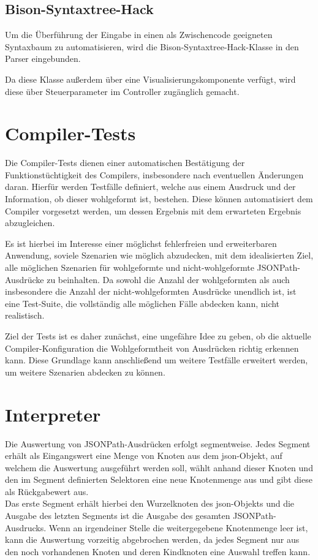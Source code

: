 \documentclass[oneside]{ausarbeitung}
\begin{document}
\subsection{Bison-Syntaxtree-Hack}

Um die Überführung der Eingabe in einen als Zwischencode geeigneten Syntaxbaum zu automatisieren, wird die Bison-Syntaxtree-Hack-Klasse \cite{Bantel:bisonhack} in den Parser eingebunden. 

Da diese Klasse außerdem über eine Visualisierungskomponente verfügt, wird diese über Steuerparameter im Controller zugänglich gemacht.



\section{Compiler-Tests}

Die Compiler-Tests dienen einer automatischen Bestätigung der Funktionstüchtigkeit des Compilers, insbesondere nach eventuellen Änderungen daran. Hierfür werden Testfälle definiert, welche aus einem Ausdruck und der Information, ob dieser wohlgeformt ist, bestehen. Diese können automatisiert dem Compiler vorgesetzt werden, um dessen Ergebnis mit dem erwarteten Ergebnis abzugleichen.

Es ist hierbei im Interesse einer möglichst fehlerfreien und erweiterbaren Anwendung, soviele Szenarien wie möglich abzudecken, mit dem idealisierten Ziel, alle möglichen Szenarien für wohlgeformte und nicht-wohlgeformte JSONPath-Ausdrücke zu beinhalten. Da sowohl die Anzahl der wohlgeformten als auch insbesondere die Anzahl der nicht-wohlgeformten Ausdrücke unendlich ist, ist eine Test-Suite, die vollständig alle möglichen Fälle abdecken kann, nicht realistisch.

Ziel der Tests ist es daher zunächst, eine ungefähre Idee zu geben, ob die aktuelle Compiler-Konfiguration die Wohlgeformtheit von Ausdrücken richtig erkennen kann. Diese Grundlage kann anschließend um weitere Testfälle erweitert werden, um weitere Szenarien abdecken zu können.



\section{Interpreter}

Die Auswertung von JSONPath-Ausdrücken erfolgt segmentweise. Jedes Segment erhält als Eingangswert eine Menge von Knoten aus dem \ac{json}-Objekt, auf welchem die Auswertung ausgeführt werden soll, wählt anhand dieser Knoten und den im Segment definierten Selektoren eine neue Knotenmenge aus und gibt diese als Rückgabewert aus. \\
Das erste Segment erhält hierbei den Wurzelknoten des \ac{json}-Objekts und die Ausgabe des letzten Segments ist die Ausgabe des gesamten JSONPath-Ausdrucks. Wenn an irgendeiner Stelle die weitergegebene Knotenmenge leer ist, kann die Auswertung vorzeitig abgebrochen werden, da jedes Segment nur aus den noch vorhandenen Knoten und deren Kindknoten eine Auswahl treffen kann.
\end{document}
